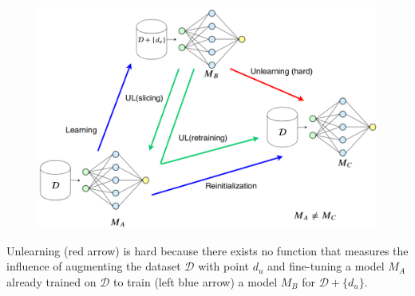 \documentclass[12pt,aspectratio=169,handout]{beamer}
\begin{document}
\begin{frame}

\begin{figure}
\includegraphics[width=0.85\linewidth]{img/unlearning1.png}	
\end{figure}
\vspace{-1.4em}
\small{
Unlearning (red arrow) is hard because there exists no function that measures the influence of augmenting the dataset $\mathcal{D}$ with point $d_u$ and fine-tuning a model $M_A$ already trained on $\mathcal{D}$ to train (left blue arrow) a model $M_B$ for $\mathcal{D} + \{d_u\}$.
}



\end{frame}
\end{document}
